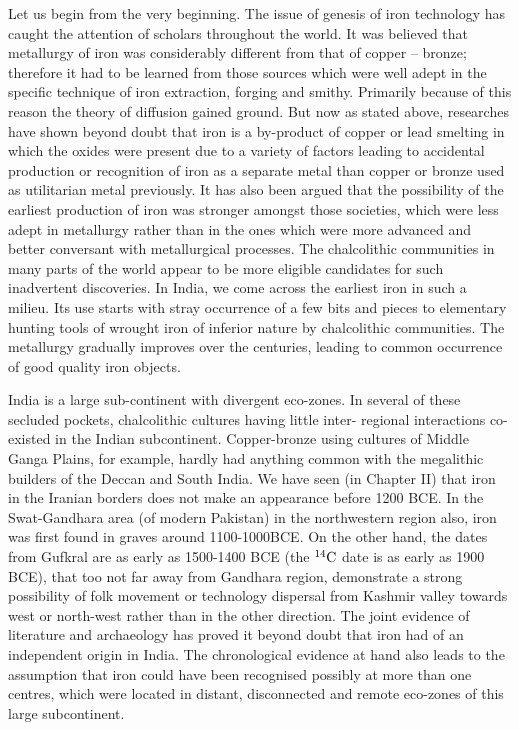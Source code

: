 Let us begin from the very beginning. The issue of genesis of iron technology has caught the attention of scholars throughout the world. It was believed that metallurgy of iron was considerably different from that of copper – bronze; therefore it had to be learned from those sources which were well adept in the specific technique of iron extraction, forging and smithy. Primarily because of this reason the theory of diffusion gained ground. But now as stated above, researches have shown beyond doubt that iron is a by-product of copper or lead smelting in which the oxides were present due to a variety of factors leading to accidental production or recognition of iron as a separate metal than copper or bronze used as utilitarian metal previously. It has also been argued that the possibility of the earliest production of iron was stronger amongst those societies, which were less adept in metallurgy rather than in the ones which were more advanced and better conversant with metallurgical processes. The chalcolithic communities in many parts of the world appear to be more eligible candidates for such inadvertent discoveries. In India, we come across the earliest iron in such a milieu. Its use starts with stray occurrence of a few bits and pieces to elementary hunting tools of wrought iron of inferior nature by chalcolithic communities. The metallurgy gradually improves over the centuries, leading to common occurrence of good quality iron objects. 

India is a large sub-continent with divergent eco-zones. In several of these secluded pockets, chalcolithic cultures having little inter- regional interactions co-existed in the Indian subcontinent. Copper-bronze using cultures of Middle Ganga Plains, for example, hardly had anything common with the megalithic builders of the Deccan and South India. We have seen (in Chapter II) that iron in the Iranian borders does not make an appearance before 1200 BCE. In the Swat-Gandhara area (of modern Pakistan) in the northwestern region also, iron was first found in graves around 1100-1000BCE. On the other hand, the dates from Gufkral are as early as 1500-1400 BCE (the ${}^{14}{\rm C}$ date is as early as 1900 BCE), that too not far away from Gandhara region, demonstrate a strong possibility of folk movement or technology dispersal from Kashmir valley towards west or north-west rather than in the other direction. The joint evidence of literature and archaeology has proved it beyond doubt that iron had of an independent origin in India. The chronological evidence at hand also leads to the assumption that iron could have been recognised possibly at more than one centres, which were located in distant, disconnected and remote eco-zones of this large subcontinent. 

